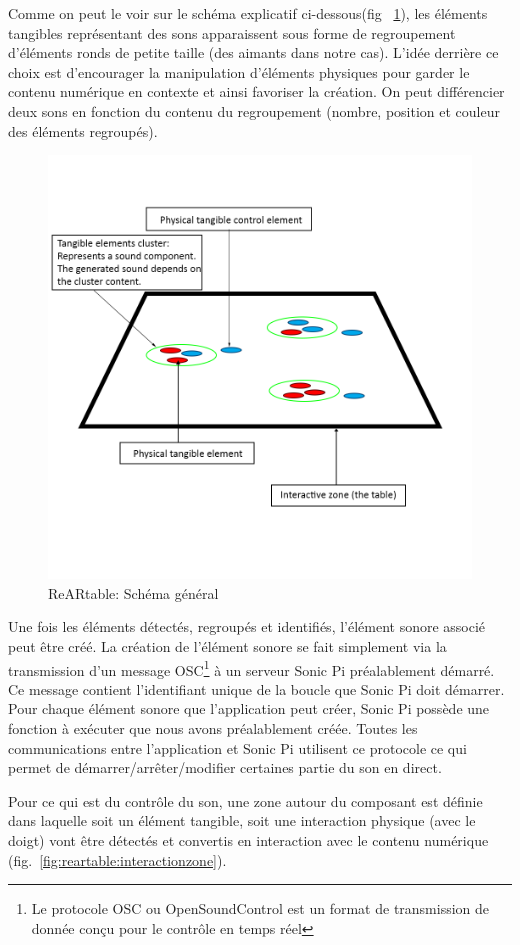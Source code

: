 Comme on peut le voir sur le schéma explicatif ci-dessous(fig ~\ref{fig:reartable:generalscheme}), les éléments tangibles représentant des sons apparaissent sous forme de regroupement d'éléments ronds de petite taille (des aimants dans notre cas). L'idée derrière ce choix est d'encourager la manipulation d'éléments physiques pour garder le contenu numérique en contexte et ainsi favoriser la création. On peut différencier deux sons en fonction du contenu du regroupement (nombre, position et couleur des éléments regroupés).

\begin{figure}[H]
\centering
\includegraphics[width=0.5\linewidth]{images/rearproto}
\caption{ReARtable: Schéma général}
\label{fig:reartable:generalscheme}
\end{figure}

Une fois les éléments détectés, regroupés et identifiés, l'élément sonore associé peut être créé. La création de l'élément sonore se fait simplement via la transmission d'un message OSC\footnote{Le protocole OSC ou OpenSoundControl est un format de transmission de donnée conçu pour le contrôle en temps réel} à un serveur Sonic Pi préalablement démarré. Ce message contient l'identifiant unique de la boucle que Sonic Pi doit démarrer. Pour chaque élément sonore que l'application peut créer, Sonic Pi possède une fonction à exécuter que nous avons préalablement créée. Toutes les communications entre l'application et Sonic Pi utilisent ce protocole ce qui permet de démarrer/arrêter/modifier certaines partie du son en direct.

Pour ce qui est du contrôle du son, une zone autour du composant est définie dans laquelle soit un élément tangible, soit une interaction physique (avec le doigt) vont être détectés et convertis en interaction avec le contenu numérique (fig.~\ref{fig:reartable:interactionzone}).

